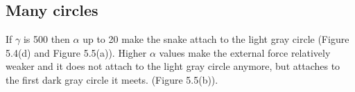 \documentclass[paper=a4, fontsize=11pt]{scrartcl} %
\numberwithin{equation}{section} %
\numberwithin{figure}{section} %
\numberwithin{table}{section} %
\begin{document}
\subsection{Many circles}
If $\gamma$ is 500 then $\alpha$ up to 20 make the snake attach to the light gray circle (Figure 5.4(d) and Figure 5.5(a)). Higher $\alpha$ values make the external force relatively weaker and it does not attach to the light gray circle anymore, but attaches to the first dark gray circle it meets. (Figure 5.5(b)). 
\end{document}
